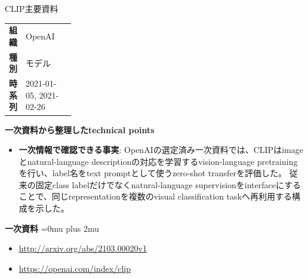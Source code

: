 \begin{technicalnote}{CLIP}{主要資料}
\begingroup
\begin{tabularx}{\linewidth}{@{}>{\bfseries}p{0.22\linewidth}X@{}}
組織 & OpenAI \\
種別 & モデル \\
時系列 & 2021-01-05, 2021-02-26 \\
\end{tabularx}
\smallskip
{\bfseries 一次資料から整理したtechnical points}
\begin{itemize}[leftmargin=1.5em,itemsep=0.35em]
\item \textbf{一次情報で確認できる事実}: OpenAIの選定済み一次資料では、CLIPはimageとnatural-language descriptionの対応を学習するvision-language pretrainingを行い、label名をtext promptとして使うzero-shot transferを評価した。 従来の固定class labelだけでなくnatural-language supervisionをinterfaceにすることで、同じrepresentationを複数のvisual classification taskへ再利用する構成を示した。
\end{itemize}
\begin{minipage}{\linewidth}
\begin{samepage}
{\bfseries 一次資料}
\begingroup\sloppy
\Urlmuskip=0mu plus 2mu\relax
\begin{itemize}[leftmargin=1.5em,itemsep=0.25em]
\item {\scriptsize\url{http://arxiv.org/abs/2103.00020v1}}
\item {\scriptsize\url{https://openai.com/index/clip}}
\end{itemize}
\endgroup
\end{samepage}
\end{minipage}
\endgroup
\end{technicalnote}
\medskip

